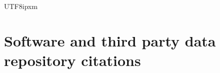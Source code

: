 \documentclass[linenumbers,trackchanges]{aastex701}
\begin{document}
\begin{CJK*}{UTF8}{ipxm}
\section{Software and third party data repository citations} \label{sec:cite}







\begin{acknowledgments}

\end{acknowledgments}

\begin{contribution}


\end{contribution}
\end{CJK*}
\end{document}
